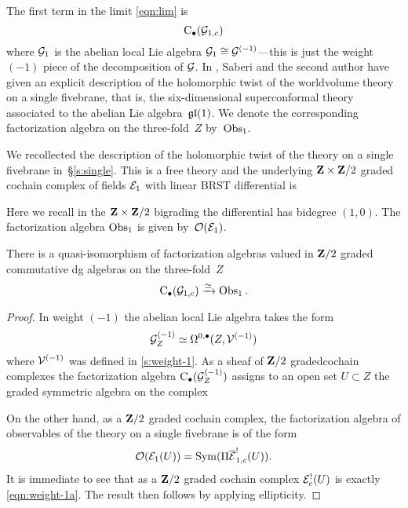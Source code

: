 The first term in the limit \eqref{eqn:lim} is 
\[
{\rm C}_\bullet(\mathcal G_{1,c})
\]
where $\mathcal G_1$ is the abelian local Lie algebra $\mathcal G_{1} \cong \mathcal G^{(-1)}$---this is just the weight $(-1)$ piece of the decomposition of $\mathcal G$. 
In \cite{SWtensor}, Saberi and the second author have given an explicit description of the holomorphic twist of the worldvolume theory on a single fivebrane, that is, the six-dimensional superconformal theory associated to the abelian Lie algebra~$\mathfrak{gl}(1)$.
We denote the corresponding factorization algebra on the three-fold~$Z$ by~$\operatorname{Obs}_1$.

We recollected the description of the holomorphic twist of the theory on a single fivebrane in~\S\ref{s:single}. 
This is a free theory and the underlying $\mathbf{Z} \times \mathbf{Z}/2$ graded cochain complex of fields $\mathcal E_{1}$ with linear BRST differential is
\beqn
{} 
\eeqn
Here we recall in the $\mathbf{Z} \times \mathbf{Z}/2$ bigrading the differential has bidegree $(1,0)$. 
The factorization algebra $\operatorname{Obs}_1$ is given by~$\mathcal O(\mathcal E_1)$.

\begin{prop}
\label{prop:factabelian}
There is a quasi-isomorphism of factorization algebras valued in $\mathbf{Z}/2$ graded commutative dg algebras on the three-fold~$Z$
\[
{\rm C}_\bullet(\mathcal G_{1,c}) \xrightarrow{\simeq} \operatorname{Obs}_{1} .
\]
\end{prop}

\begin{proof}
In weight $(-1)$ the abelian local Lie algebra takes the form
\[
\mathcal G_Z^{(-1)} \simeq \Omega^{0,\bullet}(Z,\mathcal V^{(-1)}) 
\]
where $\mathcal V^{(-1)}$ was defined in \ref{s:weight-1}.
As a sheaf of $\mathbf{Z}/2$ gradedcochain complexes the factorization algebra ${\rm C}_\bullet(\mathcal G_Z^{(-1)})$ assigns to an open set $U\subset Z$ the graded symmetric algebra on the complex
\beqn\label{eqn:weight-1a}
\eeqn
On the other hand, as a $\mathbf{Z}/2$ graded cochain complex, the factorization algebra of observables of the theory on a single fivebrane is of the form 
\[
\mathcal O(\mathcal E_{1}(U)) = \operatorname{Sym}(\Pi \overline{\mathcal E}_{1,c}^!(U)) .
\]
It is immediate to see that as a $\mathbf{Z}/2$ graded cochain complex $\mathcal E_c^!(U)$ is exactly \eqref{eqn:weight-1a}.
The result then follows by applying ellipticity.
\end{proof}

